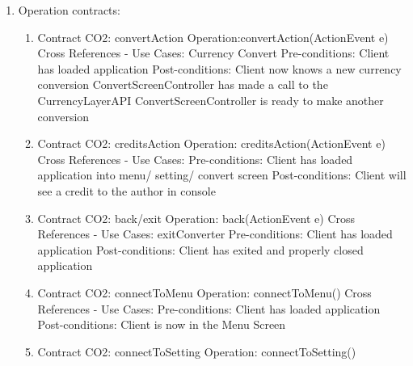 \documentclass[12pt]{article}
\begin{document}
\begin{enumerate}
\item   Operation contracts: 

\begin{enumerate}
\item Contract CO2: convertAction
\newline Operation:convertAction(ActionEvent e)
\newline Cross References - Use Cases: Currency Convert
\newline Pre-conditions: Client has loaded application
\newline Post-conditions: Client now knows a new currency conversion
\newline ConvertScreenController has made a call to the CurrencyLayerAPI
\newline ConvertScreenController is ready to make another conversion
\newline
\item Contract CO2: creditsAction
\newline Operation: creditsAction(ActionEvent e)
\newline Cross References - Use Cases:
\newline Pre-conditions: Client has loaded application into menu/ setting/ convert screen
\newline Post-conditions: Client will see a credit to the author in console
\newline
\item Contract CO2: back/exit
\newline Operation: back(ActionEvent e)
\newline Cross References - Use Cases: exitConverter
\newline Pre-conditions: Client has loaded application
\newline Post-conditions: Client has exited and properly closed application
\newline
\item Contract CO2: connectToMenu
\newline Operation: connectToMenu()
\newline Cross References - Use Cases: 
\newline Pre-conditions: Client has loaded application
\newline Post-conditions: Client is now in the Menu Screen
\newline
\item Contract CO2: connectToSetting
\newline Operation: connectToSetting()

\end{enumerate}
\end{enumerate}
\end{document}
